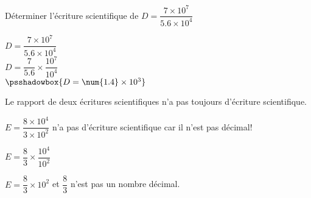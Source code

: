 \begin{methode*1}
    \exercice
    Déterminer l'écriture scientifique de $D=\dfrac{7\times 10^7}{\num{5.6} \times 10^4}$
    \correction

    $D=\dfrac{7\times 10^7}{\num{5.6} \times 10^4}$\\
    $D=\dfrac{7}{\num{5.6}}\times \dfrac{10^7}{10^4}$\\
    $\psshadowbox{D=\num{1.4}\times 10^3}$
\end{methode*1}

\begin{myBox}{  }
    Le rapport de deux écritures scientifiques n'a pas toujours d'écriture scientifique.

    \medskip
    {\raggedright
    $E=\dfrac{8\times 10^4}{3 \times 10^2}$ n'a pas d'écriture scientifique car il n'est pas décimal!

    \smallskip
    $E=\dfrac{8}{3}\times \dfrac{10^4}{10^2}$

    \smallskip
    $E=\dfrac{8}{3}\times 10^2$ et $\dfrac{8}{3}$ n'est pas un nombre décimal.

    }
\end{myBox}